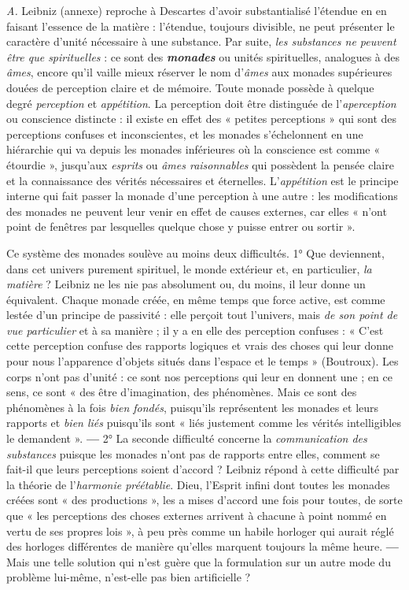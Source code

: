 {\it A.} Leibniz (annexe) reproche à Descartes d’avoir substantialisé
l'étendue en en faisant l’essence de la matière : l'étendue, toujours
divisible, ne peut présenter le caractère d’unité nécessaire à une
substance. Par suite, {\it les substances ne peuvent être que spirituelles} :
ce sont des \textbf{\textit {monades}} ou unités spirituelles, analogues à des {\it âmes},
encore qu’il vaille mieux réserver le nom d’{\it âmes} aux monades supérieures
douées de perception claire et de mémoire. Toute monade
possède à quelque degré {\it perception} et {\it appétition}. La perception doit
être distinguée de l’{\it aperception} ou conscience distincte : il existe
en effet des « petites perceptions » qui sont des perceptions confuses
et inconscientes, et les monades s’échelonnent en une hiérarchie qui
va depuis les monades inférieures où la conscience est comme « étourdie »,
jusqu’aux {\it esprits} ou {\it âmes raisonnables} qui possèdent la pensée
claire et la connaissance des vérités nécessaires et éternelles. L’{\it appétition}
est le principe interne qui fait passer la monade d’une perception
à une autre : les modifications des monades ne peuvent
leur venir en effet de causes
externes, car elles « n’ont point de
fenêtres par lesquelles quelque
chose y puisse entrer ou sortir ».

Ce système des monades soulève au moins deux difficultés. 1° Que
deviennent, dans cet univers purement spirituel, le monde extérieur
et, en particulier, {\it la matière} ? Leibniz
ne les nie pas absolument ou, du moins, il leur donne un équivalent.
Chaque monade créée, en même temps que force active, est comme
lestée d’un principe de passivité : elle perçoit tout l'univers, mais {\it de
son point de vue particulier} et à sa
manière ; il y a en elle des perception confuses : « C’est cette perception
confuse des rapports logiques et vrais des choses qui leur donne pour nous
l'apparence d'objets situés dans l’espace et le temps » (Boutroux).
Les corps n'ont pas d'unité : ce sont nos perceptions qui leur en donnent
une ; en ce sens, ce sont « des être d'imagination, des phénomènes.
Mais ce sont des phénomènes à la fois {\it bien fondés}, puisqu'ils représentent
les monades et leurs rapports et {\it bien liés} puisqu'ils sont « liés justement
comme les vérités intelligibles le
demandent ». {\bf —} 2° La seconde difficulté concerne la {\it communication des
substances} puisque les monades n'ont pas de rapports entre elles,
comment se fait-il que leurs perceptions soient d'accord ? Leibniz répond
à cette difficulté par la théorie de
l'\textsf{\textit {harmonie préétablie}}. Dieu, l'Esprit
infini dont toutes les monades créées sont « des productions », les a mises
d'accord une fois pour toutes, de sorte que « les perceptions des choses
externes arrivent à chacune à point
nommé en vertu de ses propres lois », à peu près comme un habile horloger
qui aurait réglé des horloges différentes de manière qu’elles marquent
toujours la même heure. {\bf —} Mais une telle solution qui n’est guère que la
formulation sur un autre mode du problème lui-même, n'est-elle pas bien
artificielle ?

